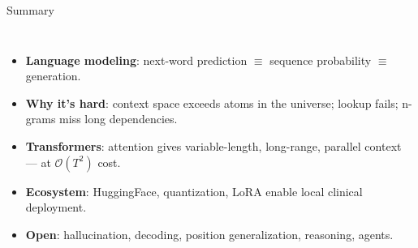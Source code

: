 \documentclass[aspectratio=169, 10pt]{beamer}
\begin{document}
\begin{frame}{Summary}

\begin{columns}[T]
\begin{itemize}
  \item<1-> \textbf{Language modeling}: next-word prediction $\equiv$ sequence probability $\equiv$ generation.
  \item<2-> \textbf{Why it's hard}: context space exceeds atoms in the universe; lookup fails; n-grams miss long dependencies.
  \item<3-> \textbf{Transformers}: attention gives variable-length, long-range, parallel context --- at $\mathcal{O}(T^2)$ cost.
  \item<4-> \textbf{Ecosystem}: HuggingFace, quantization, LoRA enable local clinical deployment.
  \item<5-> \textbf{Open}: hallucination, decoding, position generalization, reasoning, agents.
\end{itemize}

\vspace{4pt}
\end{columns}

\end{frame}

\appendix
\end{document}
